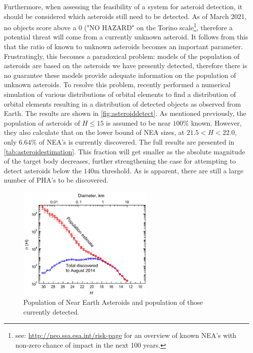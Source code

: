 Furthermore, when assessing the feasibility of a system for asteroid detection, it should be considered which asteroids still need to be detected. As of March 2021, no objects score above a 0 ("NO HAZARD" on the Torino scale\footnote{see: \url{http://neo.ssa.esa.int/risk-page} for an overview of known NEA's with non-zero chance of impact in the next 100 years.}, therefore a potential threat will come from a currently unknown asteroid. It follows from this that the ratio of known to unknown asteroids becomes an important parameter. Frustratingly, this becomes a paradoxical problem: models of the population of asteroids are based on the asteroids we have presently detected, therefore there is no guarantee these models provide adequate information on the population of unknown asteroids. To resolve this problem, \cite{populationofnea} recently performed a numerical simulation of various distributions of orbital elements to find a distribution of orbital elements resulting in a distribution of detected objects as observed from Earth. The results are shown in \autoref{fig:asteroiddetect}. As mentioned previously, the population of asteroids of $H \leq 15$ is assumed to be near $100\%$ known. However, they also calculate that on the lower bound of NEA sizes, at $21.5 < H < 22.0$, only $6.64\%$ of NEA's is currently discovered. The full results are presented in \autoref{tab:asteroidestimation}. This fraction will get smaller as the absolute magnitude of the target body decreases, further strengthening the case for attempting to detect asteroids below the $140$m threshold. As is apparent, there are still a large number of PHA's to be discovered.

\begin{figure}[htbp]
    \centering
    \includegraphics[width=0.6\textwidth]{images/asteroiddiscoveredexpected.png}
    \caption{Population of Near Earth Asteroids and population of those currently detected.}
    \label{fig:asteroiddetect}
\end{figure}

